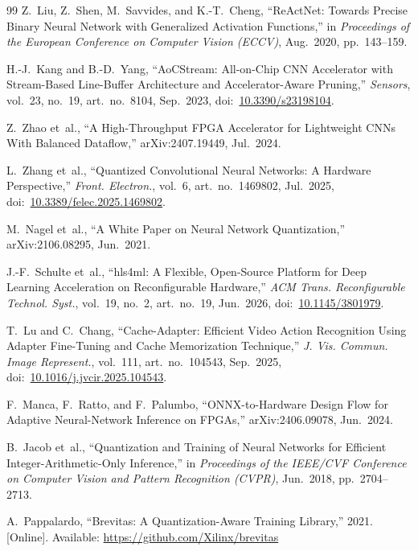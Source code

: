 \documentclass[12pt, a4paper]{report}
\numberwithin{equation}{chapter}
\numberwithin{figure}{chapter}
\numberwithin{table}{chapter}
\numberwithin{algorithm}{chapter}
\begin{document}
\begin{thebibliography}{99}
Z.~Liu, Z.~Shen, M.~Savvides, and K.-T.~Cheng,
``ReActNet: Towards Precise Binary Neural Network with Generalized Activation Functions,''
in \emph{Proceedings of the European Conference on Computer Vision (ECCV)}, Aug.~2020, pp.~143--159.

H.-J.~Kang and B.-D.~Yang,
``AoCStream: All-on-Chip CNN Accelerator with Stream-Based Line-Buffer Architecture and Accelerator-Aware Pruning,''
\emph{Sensors}, vol.~23, no.~19, art.~no.~8104, Sep.~2023,
doi:~\url{10.3390/s23198104}.


Z.~Zhao et~al.,
``A High-Throughput FPGA Accelerator for Lightweight CNNs With Balanced Dataflow,''
arXiv:2407.19449, Jul.~2024.


L.~Zhang et~al.,
``Quantized Convolutional Neural Networks: A Hardware Perspective,''
\emph{Front. Electron.}, vol.~6, art.~no.~1469802, Jul.~2025,
doi:~\url{10.3389/felec.2025.1469802}.

M.~Nagel et~al.,
``A White Paper on Neural Network Quantization,''
arXiv:2106.08295, Jun.~2021.

J.-F.~Schulte et~al.,
``hls4ml: A Flexible, Open-Source Platform for Deep Learning Acceleration on Reconfigurable Hardware,''
\emph{ACM Trans. Reconfigurable Technol. Syst.}, vol.~19, no.~2, art.~no.~19, Jun.~2026,
doi:~\url{10.1145/3801979}.


T.~Lu and C.~Chang,
``Cache-Adapter: Efficient Video Action Recognition Using Adapter Fine-Tuning and Cache Memorization Technique,''
\emph{J. Vis. Commun. Image Represent.}, vol.~111, art.~no.~104543, Sep.~2025,
doi:~\url{10.1016/j.jvcir.2025.104543}.

F.~Manca, F.~Ratto, and F.~Palumbo,
``ONNX-to-Hardware Design Flow for Adaptive Neural-Network Inference on FPGAs,''
arXiv:2406.09078, Jun.~2024.

B.~Jacob et~al.,
``Quantization and Training of Neural Networks for Efficient Integer-Arithmetic-Only Inference,''
in \emph{Proceedings of the IEEE/CVF Conference on Computer Vision and Pattern Recognition (CVPR)}, Jun.~2018, pp.~2704--2713.


A.~Pappalardo,
``Brevitas: A Quantization-Aware Training Library,''
2021. [Online]. Available: \url{https://github.com/Xilinx/brevitas}


\end{thebibliography}
\end{document}
